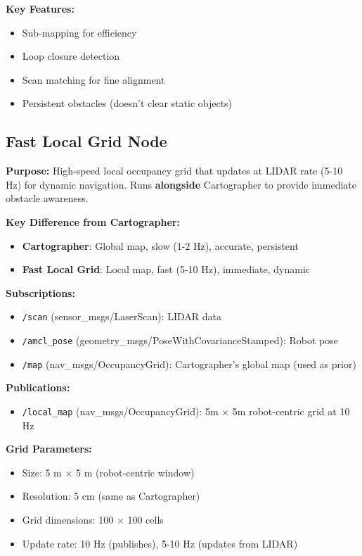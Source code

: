 \documentclass[11pt]{article}
\begin{document}
\textbf{Key Features:}
\begin{itemize}
    \item Sub-mapping for efficiency
    \item Loop closure detection
    \item Scan matching for fine alignment
    \item Persistent obstacles (doesn't clear static objects)
\end{itemize}

\subsection{Fast Local Grid Node}

\textbf{Purpose:} High-speed local occupancy grid that updates at LIDAR rate (5-10 Hz) for dynamic navigation. Runs \textbf{alongside} Cartographer to provide immediate obstacle awareness.

\textbf{Key Difference from Cartographer:}
\begin{itemize}
    \item \textbf{Cartographer}: Global map, slow (1-2 Hz), accurate, persistent
    \item \textbf{Fast Local Grid}: Local map, fast (5-10 Hz), immediate, dynamic
\end{itemize}

\textbf{Subscriptions:}
\begin{itemize}
    \item \texttt{/scan} (sensor\_msgs/LaserScan): LIDAR data
    \item \texttt{/amcl\_pose} (geometry\_msgs/PoseWithCovarianceStamped): Robot pose
    \item \texttt{/map} (nav\_msgs/OccupancyGrid): Cartographer's global map (used as prior)
\end{itemize}

\textbf{Publications:}
\begin{itemize}
    \item \texttt{/local\_map} (nav\_msgs/OccupancyGrid): 5m $\times$ 5m robot-centric grid at 10 Hz
\end{itemize}

\textbf{Grid Parameters:}
\begin{itemize}
    \item Size: 5 m $\times$ 5 m (robot-centric window)
    \item Resolution: 5 cm (same as Cartographer)
    \item Grid dimensions: 100 $\times$ 100 cells
    \item Update rate: 10 Hz (publishes), 5-10 Hz (updates from LIDAR)
\end{itemize}
\end{document}
